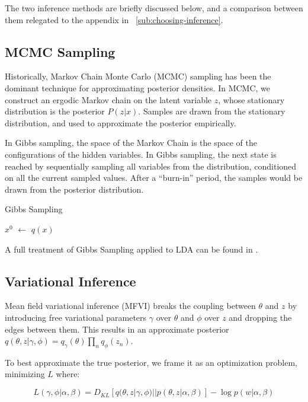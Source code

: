 \documentclass[letterpaper]{article}
\begin{document}
The two inference methods are briefly discussed below, and a
comparison between them relegated to the appendix in
~\autoref{sub:choosing-inference}.

\subsection{MCMC Sampling}
\label{subsec:mcmc-sampling}
Historically, Markov Chain Monte Carlo (MCMC) sampling has been the
dominant technique for approximating posterior densities. In MCMC, we
construct an ergodic Markov chain on the latent variable $z$,
whose stationary distribution is the posterior $P( z | x)$.
Samples are drawn from the stationary distribution, and used to
approximate the posterior empirically.

In Gibbs sampling, the space of the Markov Chain is the space of the
configurations of the hidden variables. In Gibbs sampling, the next
state is reached by sequentially sampling all variables from the
distribution, conditioned on all the current sampled values. After a
``burn-in'' period, the samples would be drawn from the posterior
distribution.

\begin{algorithm}
\caption{Gibbs Sampling}\label{alg:gibbs}
\begin{algorithmic}[1]
  \State $x^{0}$ $\gets$ $q(x)$
  \EndFor
  \EndFor
\end{algorithmic}
\end{algorithm}

A full treatment of Gibbs Sampling applied to LDA can be found in
\cite{griffiths2002gibbs}.

\subsection{Variational Inference}
\label{subsec:vi}
Mean field variational inference (MFVI) breaks the coupling between
$\theta$ and $z$ by introducing free variational parameters $\gamma$
over $\theta$ and $\phi$ over $z$ and dropping the edges between them.
This results in an approximate posterior $q(\theta, z | \gamma, \phi)
= q_\gamma(\theta)\prod_nq_\phi(z_n)$.

To best approximate the true posterior, we frame it as an optimization
problem, minimizing $L$ where:

\begin{equation}
L(\gamma, \phi | \alpha, \beta) = D_{KL}\left[ q(\theta, z | \gamma,
  \phi) || p(\theta, z | \alpha, \beta) \right] - \log p(w | \alpha, \beta)
\end{equation}
\end{document}

